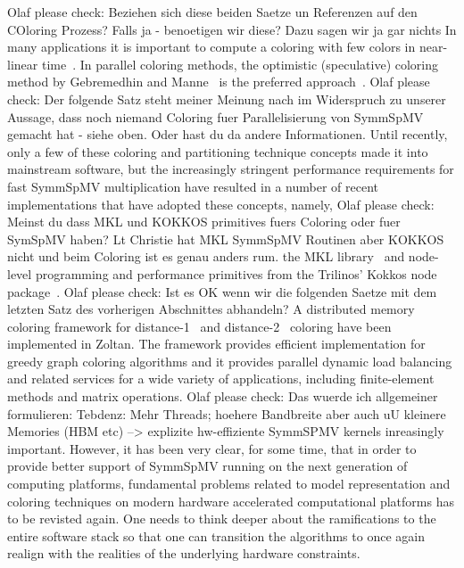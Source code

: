 {\GW Olaf please check: Beziehen sich diese beiden Saetze un Referenzen auf den COloring Prozess? Falls ja - benoetigen wir diese? Dazu sagen wir ja gar nichts}
In many applications it is important to compute a coloring with few
colors in near-linear time~\cite{doi:10.1137/13093426X}.
In parallel coloring methods, the optimistic (speculative) coloring method by Gebremedhin
and Manne~\cite{gebremedhin2000scalable} is the preferred
approach~\cite{Boman:2016}.  
{\GW Olaf please check: Der folgende Satz steht meiner Meinung nach im Widerspruch zu unserer Aussage, dass noch niemand Coloring fuer Parallelisierung von SymmSpMV gemacht hat - siehe oben. Oder hast du da andere Informationen.}
Until recently, only a few of these
coloring and partitioning technique concepts made it into mainstream
software, but the increasingly stringent performance requirements for
fast \acrshort{SymmSpMV} multiplication have resulted in a number of recent
implementations that have adopted these concepts, namely,
{\GW Olaf please check: Meinst du dass MKL und KOKKOS primitives fuers Coloring oder fuer SymSpMV haben? Lt Christie hat MKL SymmSpMV Routinen aber KOKKOS nicht und beim Coloring ist es genau anders rum.}
the \acrshort{MKL} library~\cite{MKL} and node-level programming and
performance primitives from the Trilinos' Kokkos node
package~\cite{kokkos}. 
{\GW Olaf please check: Ist es OK wenn wir die folgenden Saetze mit dem letzten Satz des vorherigen Abschnittes abhandeln?}
A distributed memory coloring framework for
distance-1~\cite{BOZDAG2008515} and
distance-2~\cite{doi:10.1137/080732158} coloring have been implemented
in Zoltan. The framework provides efficient implementation for greedy
graph coloring algorithms and it provides parallel dynamic load
balancing and related services for a wide variety of applications,
including finite-element methods and matrix operations.  
%
{\GW Olaf please check: Das wuerde ich allgemeiner formulieren: Tebdenz: Mehr Threads; hoehere Bandbreite aber auch uU kleinere Memories (HBM etc) --> explizite hw-effiziente SymmSPMV kernels inreasingly important.}
However, it has been very clear, for some time, that in order to provide better
support of \acrshort{SymmSpMV} running on the next generation of
computing platforms, fundamental problems related to model
representation and coloring techniques on modern hardware accelerated
computational platforms has to be revisted again. One needs to think
deeper about the ramifications to the entire software stack so
that one can transition the algorithms to once again realign with the
realities of the underlying hardware constraints. 

